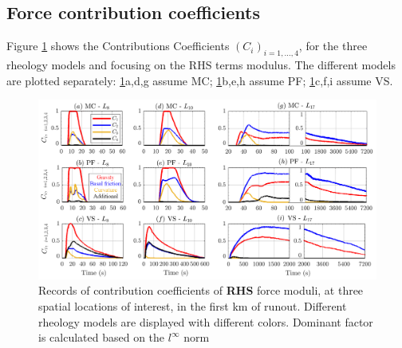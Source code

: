 \documentclass{article}
\begin{document}
\subsection{Force contribution coefficients}
Figure \ref{fig:Colima-Ci_1} shows the Contributions Coefficients $(C_i)_{i=1,\dots,4}$, for the three rheology models and focusing on the RHS terms modulus. The different models are plotted separately: \ref{fig:Colima-Ci_1}a,d,g assume MC; \ref{fig:Colima-Ci_1}b,e,h assume PF; \ref{fig:Colima-Ci_1}c,f,i assume VS.
\begin{figure}[H]
         \centering
        \includegraphics[width=1\textwidth]{BAF_VolcanDeColima/ForceContrib/Ci1_total.png}
        \caption{Records of contribution coefficients of \textbf{RHS} force moduli, at three spatial locations of interest, in the first km of runout. Different rheology models are displayed with different colors. Dominant factor is calculated based on the $l^\infty$ norm}
        \label{fig:Colima-Ci_1}
\end{figure}
\end{document}
